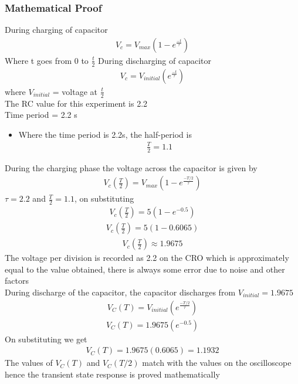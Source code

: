 \documentclass[journal]{IEEEtran}
\begin{document}
\subsubsection{Mathematical Proof}
During charging of capacitor 
\begin{align*}
    V_c = V_{max}(1-e^{\frac{-t}{\tau}})
\end{align*}
Where t goes from 0 to $\frac{t}{2}$
During discharging of capacitor
\begin{align*}
    V_c = V_{initial}(e^{\frac{-t}{\tau}})
\end{align*}
where $V_{initial}$ = voltage at $\frac{t}{2}$ \\
The RC value for this experiment is 2.2 \\
Time period = 2.2 s
\begin{itemize}
    \item Where the time period is 2.2s, the half-period is
    \begin{align*}
        \frac{T}{2}=1.1
    \end{align*}
\end{itemize}
During the charging phase the voltage across the capacitor is given by 
\begin{align*}
    V_c(\frac{T}{2}) = V_{max}(1-e^{\frac{-T/2}{\tau}}) 
\end{align*}
$\tau=2.2$ and $\frac{T}{2}=1.1$, on substituting 
\begin{align*}
    V_c(\frac{T}{2}) = 5(1-e^{-0.5})
\end{align*}
\begin{align*}
    V_c(\frac{T}{2}) = 5(1-0.6065) 
\end{align*}
\begin{align*}
    V_c(\frac{T}{2}) \approx 1.9675
\end{align*}
The voltage per division is recorded as 2.2 on the CRO which is approximately equal to the value obtained, there is always some error due to noise and other factors \\
During discharge of the capacitor, the capacitor discharges from $V_{initial} = 1.9675$
\begin{align*}
    V_C(T) = V_{initial}(e^{\frac{-T/2}{\tau}})
\end{align*}
\begin{align*}
    V_C(T) = 1.9675(e^{-0.5})
\end{align*}
On substituting we get 
\begin{align*}
    V_C(T) = 1.9675(0.6065) = 1.1932 
\end{align*}
The values of $V_C(T)$ and $V_C(T/2)$ match with the values on the oscilloscope hence the transient state response is proved mathematically 
\end{document}
